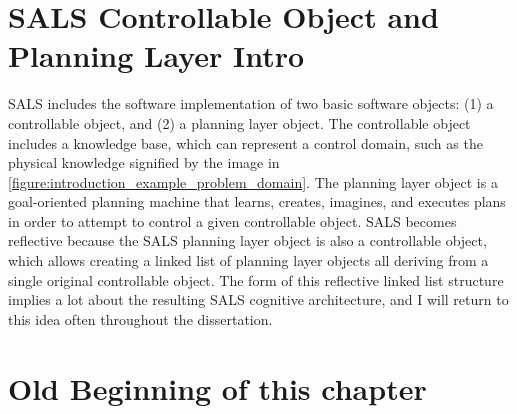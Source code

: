 \section{SALS Controllable Object and Planning Layer Intro}

SALS includes the software implementation of two basic software
objects: (1) a controllable object, and (2) a planning layer object.
The controllable object includes a knowledge base, which can represent
a control domain, such as the physical knowledge signified by the
image in {\autoref{figure:introduction_example_problem_domain}}.
The planning layer object is a goal-oriented planning machine that
learns, creates, imagines, and executes plans in order to attempt to
control a given controllable object.  SALS becomes reflective because
the SALS planning layer object is also a controllable object, which
allows creating a linked list of planning layer objects all deriving
from a single original controllable object.  The form of this
reflective linked list structure implies a lot about the resulting
SALS cognitive architecture, and I will return to this idea often
throughout the dissertation.



\newpage
\section{Old Beginning of this chapter}

